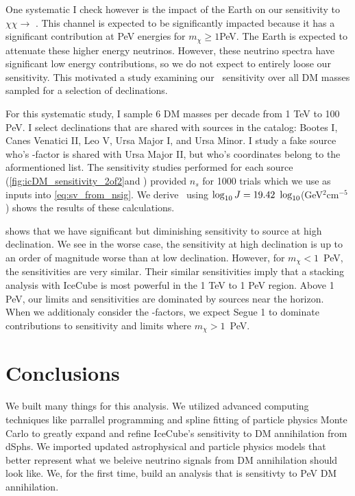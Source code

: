 One systematic I check however is the impact of the Earth on our sensitivity to $\chi\chi \rightarrow$ \parpar{\nu_\mu}.
This channel is expected to be significantly impacted because it has a significant contribution at PeV energies for $m_\chi \ge 1$PeV.
The Earth is expected to attenuate these higher energy neutrinos.
However, these neutrino spectra have significant low energy contributions, so we do not expect to entirely loose our sensitivity.
This motivated a study examining our \sv~sensitivity over all DM masses sampled for a selection of declinations.

For this systematic study, I sample 6 DM masses per decade from 1 TeV to 100 PeV.
I select declinations that are shared with sources in the \GS catalog: Bootes I, Canes Venatici II, Leo V, Ursa Major I, and Ursa Minor.
I study a fake source who's \J-factor is shared with Ursa Major II, but who's coordinates belong to the aformentioned list.
The sensitivity studies performed for each source (\cref{fig:icDM_sensitivity_2of2}and ) provided $n_s$ for 1000 trials which we use as inputs into \cref{eq:sv_from_nsig}.
We derive \sv~using $\log_{10}J = 19.42~\log_{10}$(GeV$^2$cm$^{-5}$)
 shows the results of these calculations.


 shows that we have significant but diminishing sensitivity to source at high declination.
We see in the worse case, the sensitivity at high declination is up to an order of magnitude worse than at low declination.
However, for $m_\chi < 1$~PeV, the sensitivities are very similar.
Their similar sensitivities imply that a stacking analysis with IceCube is most powerful in the 1 TeV to 1 PeV region.
Above 1 PeV, our limits and sensitivities are dominated by sources near the horizon.
When we additionaly consider the \J-factors, we expect Segue 1 to dominate contributions to sensitivity and limits where $m_\chi > 1$~PeV.

\section{Conclusions} \label{sec:icDM_conclude}

We built many things for this analysis.
We utilized advanced computing techniques like parrallel programming and spline fitting of particle physics Monte Carlo to greatly expand and refine IceCube's sensitivity to DM annihilation from dSphs.
We imported updated astrophysical and particle physics models that better represent what we beleive neutrino signals from DM annihilation should look like.
We, for the first time, build an analysis that is sensitivty to PeV DM annihilation.

